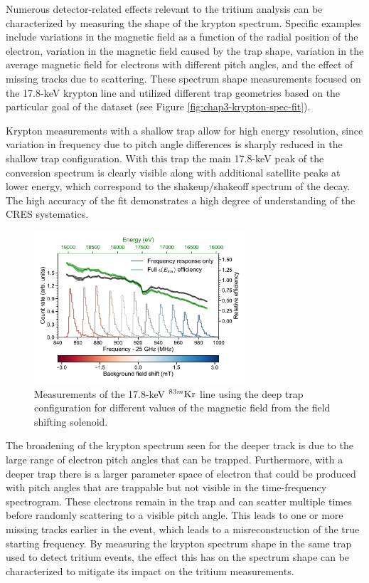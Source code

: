 Numerous detector-related effects relevant to the tritium analysis can be characterized by measuring the shape of the krypton spectrum. Specific examples include variations in the magnetic field as a function of the radial position of the electron, variation in the magnetic field caused by the trap shape, variation in the average magnetic field for electrons with different pitch angles, and the effect of missing tracks due to scattering. These spectrum shape measurements focused on the 17.8-keV krypton line and utilized different trap geometries based on the particular goal of the dataset (see Figure \ref{fig:chap3-krypton-spec-fit}).

Krypton measurements with a shallow trap allow for high energy resolution, since variation in frequency due to pitch angle differences is sharply reduced in the shallow trap configuration. With this trap the main 17.8-keV peak of the conversion spectrum is clearly visible along with additional satellite peaks at lower energy, which correspond to the shakeup/shakeoff spectrum of the decay. The high accuracy of the fit demonstrates a high degree of understanding of the CRES systematics.

\begin{figure}[htbp]
    \centering
    \includegraphics[width=0.7\textwidth]{figs/Chapter-3/fss_for_prl_plot.pdf}
    \caption{Measurements of the 17.8-keV $^{83m}\rm{Kr}$ line using the deep trap configuration for different values of the magnetic field from the field shifting solenoid.}
    \label{fig:chap3-fss-plot}
\end{figure}

The broadening of the krypton spectrum seen for the deeper track is due to the large range of electron pitch angles that can be trapped. Furthermore, with a deeper trap there is a larger parameter space of electron that could be produced with pitch angles that are trappable but not visible in the time-frequency spectrogram. These electrons remain in the trap and can scatter multiple times before randomly scattering to a visible pitch angle. This leads to one or more missing tracks earlier in the event, which leads to a misreconstruction of the true starting frequency. By measuring the krypton spectrum shape in the same trap used to detect tritium events, the effect this has on the spectrum shape can be characterized to mitigate its impact on the tritium measurements.

